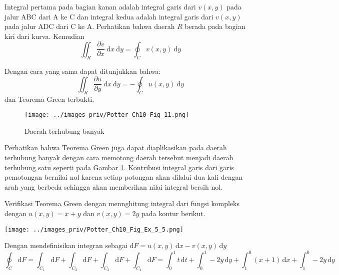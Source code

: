 Integral pertama pada bagian kanan adalah integral garis dari $v(x,y)$ pada
jalur ABC dari A ke C dan integral kedua adalah integral garis dari
$v(x,y)$ pada jalur ADC dari C ke A. Perhatikan bahwa daerah $R$
berada pada bagian kiri dari kurva. Kemudian
\begin{equation*}
\iint_{R}\frac{\partial v}{\partial x}\ \mathrm{d}x\ \mathrm{d}y=\oint_{C}v(x,y)\ \mathrm{d}y
\end{equation*}

Dengan cara yang sama dapat ditunjukkan bahwa:
\begin{equation*}
\iint_{R}\frac{\partial u}{\partial y}\ \mathrm{d}x\ \mathrm{d}y=-\oint_{C}u(x,y)\ \mathrm{d}y    
\end{equation*}
dan Teorema Green terbukti.

\begin{figure}[h]
{\centering
\texttt{[image: ../images\_priv/Potter\_Ch10\_Fig\_11.png]}
\par}
\caption{Daerah terhubung banyak}\label{fig:Potter_Ch10_Fig_11}
\end{figure}

Perhatikan bahwa Teorema Green juga dapat diaplikasikan pada daerah terhubung banyak dengan
cara memotong daerah tersebut menjadi daerah terhubung satu seperti pada Gambar
\ref{fig:Potter_Ch10_Fig_11}. Kontribusi integral garis
dari garis pemotongan bernilai nol karena setiap potongan akan dilalui dua kali dengan arah
yang berbeda sehingga akan memberikan nilai integral bersih nol.



\begin{contoh}
Verifikasi Teorema Green dengan mennghitung integral dari fungsi kompleks dengan $u(x,y) = x + y$
dan $v(x,y) = 2y$ pada kontur berikut.

{\centering
\texttt{[image: ../images\_priv/Potter\_Ch10\_Fig\_Ex\_5\_5.png]}
\par}
\end{contoh}

Dengan mendefinisikan integran sebagai $\mathrm{d}F = u(x,y)\,\mathrm{d}x - v(x,y)\,\mathrm{d}y$
\begin{equation*}
\oint_{C} \mathrm{d}F = 
\int_{C_1} \mathrm{d}F +
\int_{C_2} \mathrm{d}F +
\int_{C_3} \mathrm{d}F +
\int_{C_4} \mathrm{d}F = \int_{0}^{1} t\,\mathrm{d}t + \int_{0}^{1} -2y\,\mathrm{d}y +
\int_{1}^{0} (x + 1)\,\mathrm{d}x + \int_{1}^{0} -2y\,\mathrm{d}y
\end{equation*}

